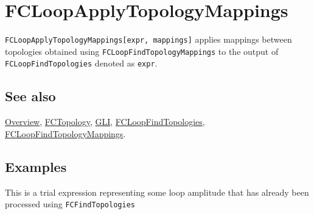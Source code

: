 \documentclass[../FeynCalcManual.tex]{subfiles}
\begin{document}
\hypertarget{fcloopapplytopologymappings}{
\section{FCLoopApplyTopologyMappings}\label{fcloopapplytopologymappings}}

\texttt{FCLoopApplyTopologyMappings[\allowbreak{}expr,\ \allowbreak{}mappings]}
applies mappings between topologies obtained using
\texttt{FCLoopFindTopologyMappings} to the output of
\texttt{FCLoopFindTopologies} denoted as \texttt{expr}.

\subsection{See also}

\hyperlink{toc}{Overview}, \hyperlink{fctopology}{FCTopology},
\hyperlink{gli}{GLI},
\hyperlink{fcloopfindtopologies}{FCLoopFindTopologies},
\hyperlink{fcloopfindtopologymappings}{FCLoopFindTopologyMappings}.

\subsection{Examples}

This is a trial expression representing some loop amplitude that has
already been processed using \texttt{FCFindTopologies}
\end{document}
